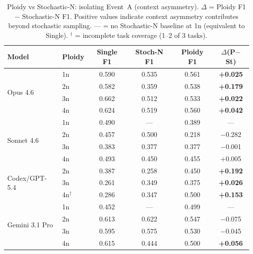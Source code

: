 \documentclass[11pt]{article}
\begin{document}
\begin{table}[H]
\centering
\caption{Ploidy vs Stochastic-N: isolating Event~A (context asymmetry). $\Delta$ = Ploidy F1 $-$ Stochastic-N F1. Positive values indicate context asymmetry contributes beyond stochastic sampling. --- = no Stochastic-N baseline at 1n (equivalent to Single). $^\dagger$ = incomplete task coverage (1--2 of 3 tasks).}
\label{tab:ploidy-sweep}
\small
\begin{tabular}{@{}llcccc@{}}
\toprule
\textbf{Model} & \textbf{Ploidy} & \textbf{Single F1} & \textbf{Stoch-N F1} & \textbf{Ploidy F1} & \textbf{$\Delta$(P$-$St)} \\
\midrule
\multirow{4}{*}{Opus 4.6}
  & 1n & 0.590 & 0.535 & 0.561 & \textbf{+0.025} \\
  & 2n & 0.582 & 0.359 & 0.538 & \textbf{+0.179} \\
  & 3n & 0.662 & 0.512 & 0.533 & \textbf{+0.022} \\
  & 4n & 0.624 & 0.519 & 0.560 & \textbf{+0.042} \\
\midrule
\multirow{4}{*}{Sonnet 4.6}
  & 1n & 0.490 & --- & 0.389 & --- \\
  & 2n & 0.457 & 0.500 & 0.218 & $-$0.282 \\
  & 3n & 0.383 & 0.377 & 0.377 & $-$0.001 \\
  & 4n & 0.493 & 0.450 & 0.455 & +0.005 \\
\midrule
\multirow{3}{*}{Codex/GPT-5.4}
  & 2n & 0.387 & 0.258 & 0.450 & \textbf{+0.192} \\
  & 3n & 0.261 & 0.349 & 0.375 & \textbf{+0.026} \\
  & 4n$^\dagger$ & 0.286 & 0.347 & 0.500 & \textbf{+0.153} \\
\midrule
\multirow{4}{*}{Gemini 3.1 Pro}
  & 1n & 0.452 & --- & 0.499 & --- \\
  & 2n & 0.613 & 0.622 & 0.547 & $-$0.075 \\
  & 3n & 0.595 & 0.575 & 0.530 & $-$0.045 \\
  & 4n & 0.615 & 0.444 & 0.500 & \textbf{+0.056} \\
\bottomrule
\end{tabular}
\end{table}
\end{document}
